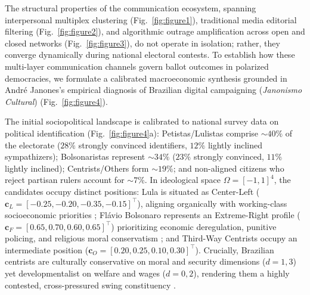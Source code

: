 \documentclass{article}
\begin{document}
The structural properties of the communication ecosystem, spanning interpersonal multiplex clustering (Fig.~\ref{fig:figure1}), traditional media editorial filtering (Fig.~\ref{fig:figure2}), and algorithmic outrage amplification across open and closed networks (Fig.~\ref{fig:figure3}), do not operate in isolation; rather, they converge dynamically during national electoral contests. To establish how these multi-layer communication channels govern ballot outcomes in polarized democracies, we formulate a calibrated macroeconomic synthesis grounded in Andr{\'e} Janones's empirical diagnosis of Brazilian digital campaigning (\emph{Janonismo Cultural}) \citep{janones2023janonismo} (Fig.~\ref{fig:figure4}).

The initial sociopolitical landscape is calibrated to national survey data on political identification \citep{datafolha2024identificacao} (Fig.~\ref{fig:figure4}a): Petistas/Lulistas comprise $\sim 40\%$ of the electorate ($28\%$ strongly convinced identifiers, $12\%$ lightly inclined sympathizers); Bolsonaristas represent $\sim 34\%$ ($23\%$ strongly convinced, $11\%$ lightly inclined); Centrists/Others form $\sim 19\%$; and non-aligned citizens who reject partisan rulers account for $\sim 7\%$. In ideological space $\Omega = [-1, 1]^4$, the candidates occupy distinct positions: Lula is situated as Center-Left ($\mathbf{c}_L = [-0.25, -0.20, -0.35, -0.15]^\top$), aligning organically with working-class socioeconomic priorities \citep{zaller1992nature}; Fl{\'a}vio Bolsonaro represents an Extreme-Right profile ($\mathbf{c}_F = [0.65, 0.70, 0.60, 0.65]^\top$) prioritizing economic deregulation, punitive policing, and religious moral conservatism \citep{cesarino2020posverdade}; and Third-Way Centrists occupy an intermediate position ($\mathbf{c}_O = [0.20, 0.25, 0.10, 0.30]^\top$). Crucially, Brazilian centrists are culturally conservative on moral and security dimensions ($d=1, 3$) yet developmentalist on welfare and wages ($d=0, 2$), rendering them a highly contested, cross-pressured swing constituency \citep{almeida2019evangelicals, datafolha2024identificacao}.
\end{document}
